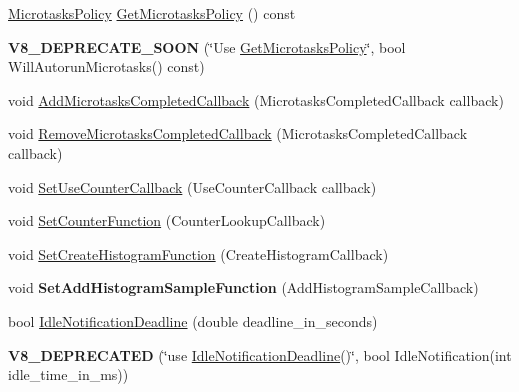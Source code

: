 \begin{DoxyCompactItemize}
\item 
\hyperlink{namespacev8_a2f183b102b3d1b7a30a805e8c53c04da}{Microtasks\+Policy} \hyperlink{classv8_1_1Isolate_a65ccc10f75f9497b6baf9535cf3f30db}{Get\+Microtasks\+Policy} () const 
\item 
{\bfseries V8\+\_\+\+D\+E\+P\+R\+E\+C\+A\+T\+E\+\_\+\+S\+O\+ON} (\char`\"{}Use \hyperlink{classv8_1_1Isolate_a65ccc10f75f9497b6baf9535cf3f30db}{Get\+Microtasks\+Policy}\char`\"{}, bool Will\+Autorun\+Microtasks() const)\hypertarget{classv8_1_1Isolate_a5123e1c47b45af3cdf51d6f635fef1f0}{}\label{classv8_1_1Isolate_a5123e1c47b45af3cdf51d6f635fef1f0}

\item 
void \hyperlink{classv8_1_1Isolate_ae9c09d4763df6c3f06c686eebcce2834}{Add\+Microtasks\+Completed\+Callback} (Microtasks\+Completed\+Callback callback)
\item 
void \hyperlink{classv8_1_1Isolate_a0fdc58db0d44c5a8f427d809e1c0b604}{Remove\+Microtasks\+Completed\+Callback} (Microtasks\+Completed\+Callback callback)
\item 
void \hyperlink{classv8_1_1Isolate_ad608b24b2c1b49a97ed4f04500976166}{Set\+Use\+Counter\+Callback} (Use\+Counter\+Callback callback)
\item 
void \hyperlink{classv8_1_1Isolate_ab59a904591d417ebb3889b5fa507447b}{Set\+Counter\+Function} (Counter\+Lookup\+Callback)
\item 
void \hyperlink{classv8_1_1Isolate_afd624c7e429a061c1cd9e5959ce6ebf0}{Set\+Create\+Histogram\+Function} (Create\+Histogram\+Callback)
\item 
void {\bfseries Set\+Add\+Histogram\+Sample\+Function} (Add\+Histogram\+Sample\+Callback)\hypertarget{classv8_1_1Isolate_ae5c813518efe1cfaccd0262ad6ed2f82}{}\label{classv8_1_1Isolate_ae5c813518efe1cfaccd0262ad6ed2f82}

\item 
bool \hyperlink{classv8_1_1Isolate_aba794ed25d4fa8780b3a07c66a5e5d4a}{Idle\+Notification\+Deadline} (double deadline\+\_\+in\+\_\+seconds)
\item 
{\bfseries V8\+\_\+\+D\+E\+P\+R\+E\+C\+A\+T\+ED} (\char`\"{}use \hyperlink{classv8_1_1Isolate_aba794ed25d4fa8780b3a07c66a5e5d4a}{Idle\+Notification\+Deadline}()\char`\"{}, bool Idle\+Notification(int idle\+\_\+time\+\_\+in\+\_\+ms))\hypertarget{classv8_1_1Isolate_a2f204e8d3ff66d940ddc58da5a202003}{}\label{classv8_1_1Isolate_a2f204e8d3ff66d940ddc58da5a202003}


\end{DoxyCompactItemize}
